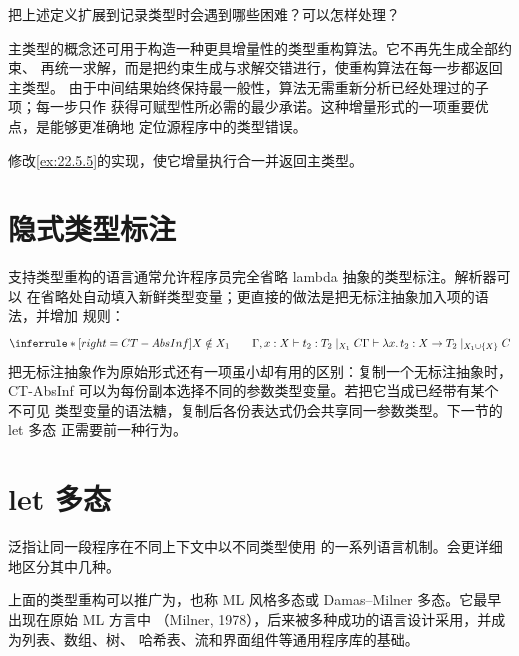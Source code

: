 \begin{exercise}[\(\star\star\star\)]
\label{ex:22.5.6}
把上述定义扩展到记录类型时会遇到哪些困难？可以怎样处理？
\end{exercise}

主类型的概念还可用于构造一种更具增量性的类型重构算法。它不再先生成全部约束、
再统一求解，而是把约束生成与求解交错进行，使重构算法在每一步都返回主类型。
由于中间结果始终保持最一般性，算法无需重新分析已经处理过的子项；每一步只作
获得可赋型性所必需的最少承诺。这种增量形式的一项重要优点，是能够更准确地
定位源程序中的类型错误。

\begin{exercise}[\(\star\star\star\), \(\nrightarrow\)]
\label{ex:22.5.7}
修改\cref{ex:22.5.5}的实现，使它增量执行合一并返回主类型。
\end{exercise}

\section{隐式类型标注}
\label{sec:22.6}

支持类型重构的语言通常允许程序员完全省略 lambda 抽象的类型标注。解析器可以
在省略处自动填入新鲜类型变量；更直接的做法是把无标注抽象加入项的语法，并增加
规则：
\[
\inferrule*[right=CT-AbsInf]
 {X\notin X_1\qquad
  \Gamma,x:X\vdash t_2:T_2\mid_{X_1}C}
 {\Gamma\vdash\lambda x.\,t_2:X\to T_2\mid_{X_1\cup\{X\}}C}
\]
把无标注抽象作为原始形式还有一项虽小却有用的区别：复制一个无标注抽象时，
CT-AbsInf 可以为每份副本选择不同的参数类型变量。若把它当成已经带有某个不可见
类型变量的语法糖，复制后各份表达式仍会共享同一参数类型。下一节的 let 多态
正需要前一种行为。

\section{let 多态}
\label{sec:22.7}

泛指让同一段程序在不同上下文中以不同类型使用
的一系列语言机制。会更详细地区分其中几种。

上面的类型重构可以推广为，也称
ML 风格多态或 Damas--Milner 多态。它最早出现在原始 ML 方言中
（Milner, 1978），后来被多种成功的语言设计采用，并成为列表、数组、树、
哈希表、流和界面组件等通用程序库的基础。

